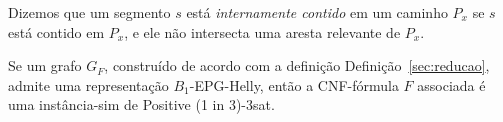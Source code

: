 \begin{definition}
Dizemos que um segmento $s$ está \emph{internamente contido} em um caminho $P_x$ se $s$ está contido em $P_x$, e ele não intersecta uma aresta relevante de  $P_x$. 
\end{definition}



\begin{lema}\label{lem:volta}
Se um grafo $G_F$, construído de acordo com a definição  Definição~\ref{sec:reducao}, admite uma representação $B_1$-EPG-Helly, então a CNF-fórmula $F$ associada é uma instância-sim de {\sc Positive (1 in 3)-3sat}.
\end{lema}

